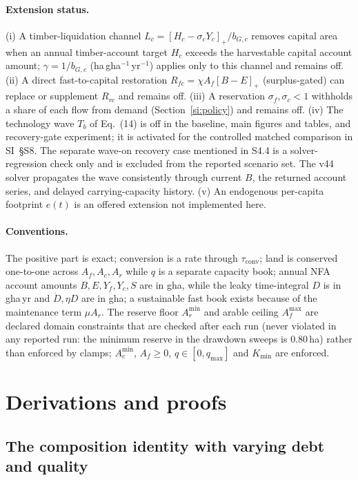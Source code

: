 \documentclass[11pt,a4paper]{article}
\newcommand{\pos}[1]{\left[#1\right]_+}
\newcommand{\Acmin}{A_c^{\min}}
\newcommand{\tconv}{\tau_{\mathrm{conv}}}
\begin{document}
\paragraph{Extension status.} (i) A timber-liquidation channel $L_c=\pos{H_c-\sigma_cY_c}/b_{G,c}$ removes capital area when an annual timber-account target $H_c$ exceeds the harvestable capital account amount; $\gamma=1/b_{G,c}$ (ha\,gha$^{-1}$\,yr$^{-1}$) applies only to this channel and remains off. (ii) A direct fast-to-capital restoration $R_{fc}=\chi A_f\pos{B-E}$ (surplus-gated) can replace or supplement $R_{rc}$ and remains off. (iii) A reservation $\sigma_f,\sigma_c<1$ withholds a share of each flow from demand (Section~\ref{si:policy}) and remains off. (iv) The technology wave $T_b$ of Eq.~(14) is off in the baseline, main figures and tables, and recovery-gate experiment; it is activated for the controlled matched comparison in SI~\S S8. The separate wave-on recovery case mentioned in S4.4 is a solver-regression check only and is excluded from the reported scenario set. The v44 solver propagates the wave consistently through current $B$, the returned account series, and delayed carrying-capacity history. (v) An endogenous per-capita footprint $e(t)$ is an offered extension not implemented here.

\paragraph{Conventions.} The positive part is exact; conversion is a rate through $\tconv$; land is conserved one-to-one across $A_f,A_c,A_r$ while $q$ is a separate capacity book; annual NFA account amounts $B,E,Y_f,Y_c,S$ are in gha, while the leaky time-integral $D$ is in gha\,yr and $\dot D,\eta D$ are in gha; a sustainable fast book exists because of the maintenance term $\mu A_r$. The reserve floor $A_r^{\min}$ and arable ceiling $A_f^{\max}$ are declared domain constraints that are checked after each run (never violated in any reported run: the minimum reserve in the drawdown sweeps is $0.80$\,ha) rather than enforced by clamps; $\Acmin$, $A_f\ge0$, $q\in[0,q_{\max}]$ and $K_{\min}$ are enforced.

\section{Derivations and proofs}\label{si:proofs}

\subsection{The composition identity with varying debt and quality}\label{si:identity}
\end{document}
